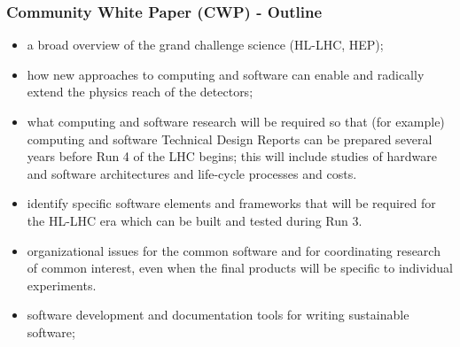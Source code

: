 \begin{frame}
\frametitle{Community White Paper (CWP) - Outline}

\begin{itemize}
  \item
    a broad overview of the grand challenge science (HL-LHC, HEP);
  \item
    how new approaches to computing and software can enable and
    radically extend the physics reach of the detectors;
  \item
    what computing and software research will be required so that
    (for example) computing and software Technical Design Reports
    can be prepared several years before Run 4 of the LHC begins;
    this will include studies of hardware and software architectures
    and life-cycle processes and costs.
   \item
    identify specific software elements and frameworks that will
    be required for the HL-LHC era which can be built and tested
    during Run 3.
   \item
     organizational issues for the common software and for
     coordinating research of common interest, even when the
     final products will be specific to individual experiments.
  \item
     software development and documentation tools for
     writing sustainable software;
\end{itemize}


\end{frame}


